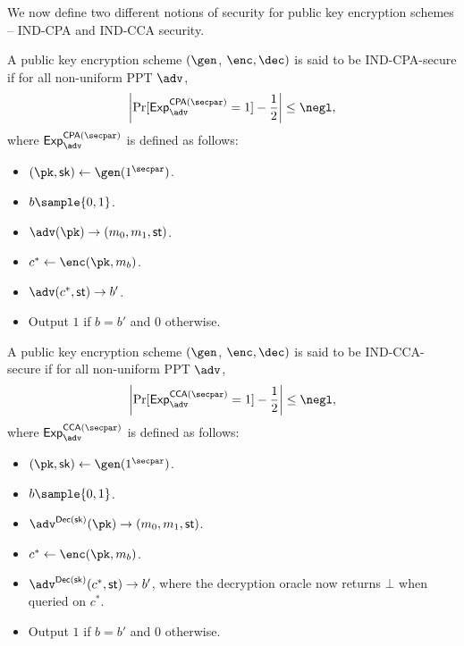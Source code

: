 We now define two different notions of security for public key encryption schemes -- IND-CPA and IND-CCA security.
\begin{definition}
    A public key encryption scheme $(\gen$, $\enc, \dec)$ is said to be IND-CPA-secure if for all non-uniform PPT $\adv$,
    \[\left|\Pr[\mathsf{Exp}_{\adv}^{\mathsf{CPA}(\secpar)} = 1] - \frac{1}{2}\right| \leq \negl,\]
    where $\mathsf{Exp}_{\adv}^{\mathsf{CPA}(\secpar)}$ is defined as follows:
    \begin{itemize}
        \item $(\pk, \sk) \gets \gen(1^\secpar)$.
        \item $b \sample \{0,1\}$.
        \item $\adv(\pk) \to (m_0, m_1, \mathsf{st})$.
        \item $c^* \gets \enc(\pk, m_b)$.
        \item $\adv(c^*, \mathsf{st}) \to b'$.
        \item Output $1$ if $b = b'$ and $0$ otherwise.
    \end{itemize}
\end{definition}

\begin{definition}
    A public key encryption scheme $(\gen$, $\enc, \dec)$ is said to be IND-CCA-secure if for all non-uniform PPT $\adv$,
    \[\left|\Pr[\mathsf{Exp}_{\adv}^{\mathsf{CCA}(\secpar)} = 1] - \frac{1}{2}\right| \leq \negl,\]
    where $\mathsf{Exp}_{\adv}^{\mathsf{CCA}(\secpar)}$ is defined as follows:
    \begin{itemize}
        \item $(\pk, \sk) \gets \gen(1^\secpar)$.
        \item $b \sample \{0,1\}$.
        \item $\adv^{\Dec(\sk)}(\pk) \to (m_0, m_1, \mathsf{st})$.
        \item $c^* \gets \enc(\pk, m_b)$.
        \item $\adv^{\Dec(\sk)}(c^*, \mathsf{st}) \to b'$, where the decryption oracle now returns $\bot$ when queried on $c^*$.
        \item Output $1$ if $b = b'$ and $0$ otherwise.
    \end{itemize}
\end{definition}

